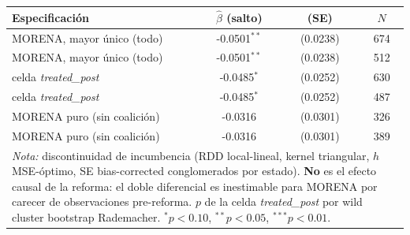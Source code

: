 \begin{tabular}{lccc}
\toprule
Especificación & $\hat{\beta}$ (salto) & (SE) & $N$ \\
\midrule
MORENA, mayor único (todo) & -0.0501$^{**}$ & (0.0238) & 674 \\
MORENA, mayor único (todo) & -0.0501$^{**}$ & (0.0238) & 512 \\
\quad celda \textit{treated\_post} & -0.0485$^{*}$ & (0.0252) & 630 \\
\quad celda \textit{treated\_post} & -0.0485$^{*}$ & (0.0252) & 487 \\
MORENA puro (sin coalición) & -0.0316 & (0.0301) & 326 \\
MORENA puro (sin coalición) & -0.0316 & (0.0301) & 389 \\
\bottomrule
\multicolumn{4}{p{0.9\textwidth}}{\footnotesize \textit{Nota:} discontinuidad de
  incumbencia (RDD local-lineal, kernel triangular, $h$ MSE-óptimo, SE bias-corrected
  conglomerados por estado). \textbf{No} es el efecto causal de la reforma: el doble
  diferencial es inestimable para MORENA por carecer de observaciones pre-reforma.
  $p$ de la celda \textit{treated\_post} por wild cluster bootstrap Rademacher.
  $^{*}p<0.10$, $^{**}p<0.05$, $^{***}p<0.01$.}
\end{tabular}
